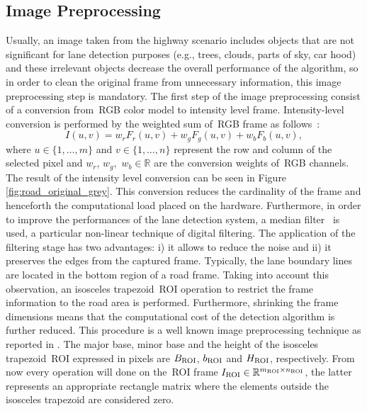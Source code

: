 \subsection{Image Preprocessing}
\label{subsec:IP}

Usually, an image taken from the highway scenario includes objects that are not significant for lane detection purposes (e.g., trees, clouds, parts of sky, car hood) and these irrelevant objects decrease the overall performance of the algorithm, so in order to clean the original frame from unnecessary information, this image preprocessing step is mandatory. The first step of the image preprocessing consist of a conversion from~\gls{RGB} color model to intensity level frame. Intensity-level conversion is performed by the
weighted sum of~\gls{RGB} frame as follows~\cite{rgbtogray}:
%
\begin{equation}
	I(u,v)=w_r F_r(u,v) + w_g F_g(u,v) + w_b F_b(u,v),
\end{equation}
%
where  $u \in \big\{1, \dots, m\big\}$ and $v \in \big\{1,\dots,n \big\}$ represent the row and column of the selected pixel and $w_r$, $w_g,$ $w_b \in \mathbb{R}$ are the conversion weights of~\gls{RGB} channels. The result of the intensity level conversion can be seen in Figure \ref{fig:road_original_grey}. This conversion reduces the cardinality of the frame and henceforth the computational load placed on the hardware. Furthermore, in order to improve the performances of the lane detection system, a median filter~\cite{gonzalez2002digital} is used, a particular non-linear technique of digital filtering. The application of the filtering stage has two advantages: i) it allows to reduce the noise and ii) it preserves the edges from the captured frame.
Typically, the lane boundary lines are located in the bottom region of a road frame. Taking into account this observation, an isosceles trapezoid~\gls{ROI} operation to restrict the frame information to the road area is performed. Furthermore, shrinking the frame dimensions means that the computational cost of the detection algorithm is further reduced. This procedure is a well known image preprocessing technique as reported in \cite{Kumar2015Stato}. The major base, minor base and the height of the isosceles trapezoid~\gls{ROI} expressed in pixels are $B_{\rm ROI}$, $b_{\rm ROI}$ and $H_{\rm ROI}$, respectively. From now every operation will done on the~\gls{ROI} frame $I_{ \rm ROI} \in \mathbb{R}^{m_{ \rm ROI} \times n_{ \rm ROI}}$, the latter represents an appropriate rectangle matrix where the elements outside the isosceles trapezoid are considered zero.

